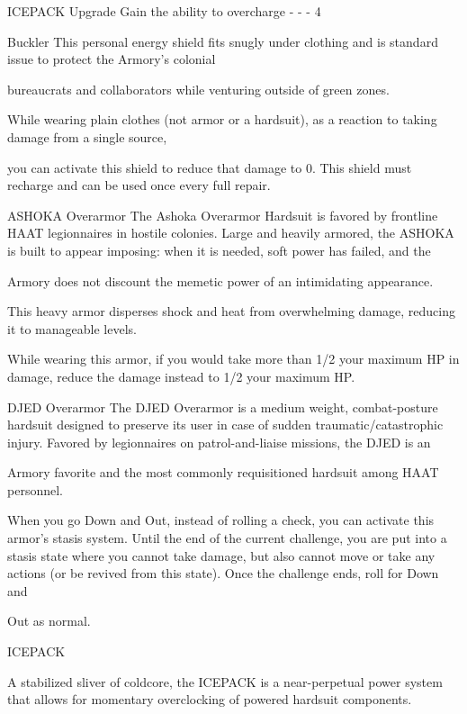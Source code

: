  ICEPACK                Upgrade     Gain the ability to overcharge             -          -              -      4 

Buckler  
This personal energy shield fits snugly under clothing and is standard issue to protect the Armory’s colonial  

bureaucrats and collaborators while venturing outside of green zones.   

While wearing plain clothes (not armor or a hardsuit), as a reaction to taking damage from a single source,  

you can activate this shield to reduce that damage to 0. This shield must recharge and can be used once  
every full repair.
 

ASHOKA Overarmor  
The Ashoka Overarmor Hardsuit is favored by frontline HAAT legionnaires in hostile colonies. Large and  
heavily armored, the ASHOKA is built to appear imposing: when it is needed, soft power has failed, and the  

Armory does not discount the memetic power of an intimidating appearance.   

This heavy armor disperses shock and heat from overwhelming damage, reducing it to manageable levels.  

While wearing this armor, if you would take more than 1/2 your maximum HP in damage, reduce the  
damage instead to 1/2 your maximum HP.
 

DJED Overarmor  
The DJED Overarmor is a medium weight, combat-posture hardsuit designed to preserve its user in case of  
sudden traumatic/catastrophic injury. Favored by legionnaires on patrol-and-liaise missions, the DJED is an  

Armory favorite and the most commonly requisitioned hardsuit among HAAT personnel.   

                                                                                                                      


When you go Down and Out, instead of rolling a check, you can activate this armor’s stasis system. Until  
the end of the current challenge, you are put into a stasis state where you cannot take damage, but also  
cannot move or take any actions (or be revived from this state). Once the challenge ends, roll for Down and  

Out as normal.
 

ICEPACK  

A stabilized sliver of coldcore, the ICEPACK is a near-perpetual power system that allows for momentary  
overclocking of powered hardsuit components.   

